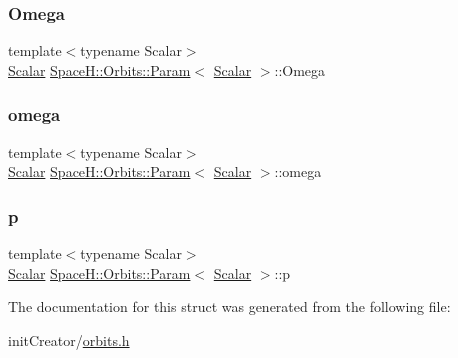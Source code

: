 \mbox{\label{struct_space_h_1_1_orbits_1_1_param_a3b8865c1d8219e642123738e90a3d649}} 
\subsubsection{\texorpdfstring{Omega}{Omega}}
{\footnotesize\ttfamily template$<$typename Scalar$>$ \\
\mbox{\hyperlink{create_kepler_8cpp_a8c2981f3f834be9448a6ab06c28748eb}{Scalar}} \mbox{\hyperlink{struct_space_h_1_1_orbits_1_1_param}{Space\+H\+::\+Orbits\+::\+Param}}$<$ \mbox{\hyperlink{create_kepler_8cpp_a8c2981f3f834be9448a6ab06c28748eb}{Scalar}} $>$\+::Omega}

\mbox{\label{struct_space_h_1_1_orbits_1_1_param_a68b12502aac994cdac86ccb4f4d5958d}} 
\subsubsection{\texorpdfstring{omega}{omega}}
{\footnotesize\ttfamily template$<$typename Scalar$>$ \\
\mbox{\hyperlink{create_kepler_8cpp_a8c2981f3f834be9448a6ab06c28748eb}{Scalar}} \mbox{\hyperlink{struct_space_h_1_1_orbits_1_1_param}{Space\+H\+::\+Orbits\+::\+Param}}$<$ \mbox{\hyperlink{create_kepler_8cpp_a8c2981f3f834be9448a6ab06c28748eb}{Scalar}} $>$\+::omega}

\mbox{\label{struct_space_h_1_1_orbits_1_1_param_ae5cfa9345566dfdb9b7f1572a504c871}} 
\subsubsection{\texorpdfstring{p}{p}}
{\footnotesize\ttfamily template$<$typename Scalar$>$ \\
\mbox{\hyperlink{create_kepler_8cpp_a8c2981f3f834be9448a6ab06c28748eb}{Scalar}} \mbox{\hyperlink{struct_space_h_1_1_orbits_1_1_param}{Space\+H\+::\+Orbits\+::\+Param}}$<$ \mbox{\hyperlink{create_kepler_8cpp_a8c2981f3f834be9448a6ab06c28748eb}{Scalar}} $>$\+::p}



The documentation for this struct was generated from the following file\+:\begin{DoxyCompactItemize}
\item 
init\+Creator/\mbox{\hyperlink{orbits_8h}{orbits.\+h}}\end{DoxyCompactItemize}
